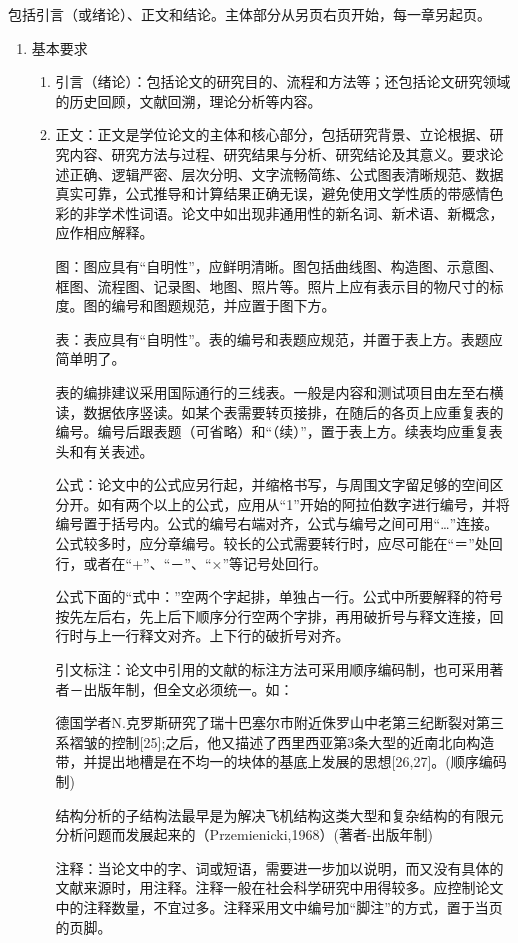 \documentclass[twoside,longtitle]{LZUthesis}
\begin{document}
包括引言（或绪论）、正文和结论。主体部分从另页右页开始，每一章另起页。
\begin{enumerate}
\item 基本要求

\begin{enumerate}
\item 引言（绪论）：包括论文的研究目的、流程和方法等；还包括论文研究领域的历史回顾，文献回溯，理论分析等内容。
\item 正文：正文是学位论文的主体和核心部分，包括研究背景、立论根据、研究内容、研究方法与过程、研究结果与分析、研究结论及其意义。要求论述正确、逻辑严密、层次分明、文字流畅简练、公式图表清晰规范、数据真实可靠，公式推导和计算结果正确无误，避免使用文学性质的带感情色彩的非学术性词语。论文中如出现非通用性的新名词、新术语、新概念，应作相应解释。


图：图应具有“自明性”，应鲜明清晰。图包括曲线图、构造图、示意图、框图、流程图、记录图、地图、照片等。照片上应有表示目的物尺寸的标度。图的编号和图题规范，并应置于图下方。


表：表应具有“自明性”。表的编号和表题应规范，并置于表上方。表题应简单明了。


表的编排建议采用国际通行的三线表。一般是内容和测试项目由左至右横读，数据依序竖读。如某个表需要转页接排，在随后的各页上应重复表的编号。编号后跟表题（可省略）和“（续）”，置于表上方。续表均应重复表头和有关表述。


公式：论文中的公式应另行起，并缩格书写，与周围文字留足够的空间区分开。如有两个以上的公式，应用从“1”开始的阿拉伯数字进行编号，并将编号置于括号内。公式的编号右端对齐，公式与编号之间可用“…”连接。公式较多时，应分章编号。较长的公式需要转行时，应尽可能在“＝”处回行，或者在“+”、“－”、“×”等记号处回行。


公式下面的“式中：”空两个字起排，单独占一行。公式中所要解释的符号按先左后右，先上后下顺序分行空两个字排，再用破折号与释文连接，回行时与上一行释文对齐。上下行的破折号对齐。


引文标注：论文中引用的文献的标注方法可采用顺序编码制，也可采用著者－出版年制，但全文必须统一。如：


德国学者N.克罗斯研究了瑞十巴塞尔市附近侏罗山中老第三纪断裂对第三系褶皱的控制{[}25{]};之后，他又描述了西里西亚第3条大型的近南北向构造带，并提出地槽是在不均一的块体的基底上发展的思想{[}26,27{]}。(顺序编码制)


结构分析的子结构法最早是为解决飞机结构这类大型和复杂结构的有限元分析问题而发展起来的（Przemienicki,1968）(著者-出版年制)


注释：当论文中的字、词或短语，需要进一步加以说明，而又没有具体的文献来源时，用注释。注释一般在社会科学研究中用得较多。应控制论文中的注释数量，不宜过多。注释采用文中编号加“脚注”的方式，置于当页的页脚。


\end{enumerate}
\end{enumerate}
\end{document}
